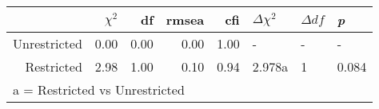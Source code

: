 \begin{table}[ht]
\centering
\begin{tabular}{rrrrrlll}
  \hline
 & $\chi^{2}$ & df & rmsea & cfi & $\Delta\chi^{2}$ & $\Delta df$ & \textit{p} \\ 
  \hline
Unrestricted & 0.00 & 0.00 & 0.00 & 1.00 & - & - & - \\ 
  Restricted & 2.98 & 1.00 & 0.10 & 0.94 & 2.978a & 1 & 0.084 \\ 
   \hline
\multicolumn{4}{l}{a = Restricted vs Unrestricted} \\
 \hline
\end{tabular}
\end{table}
